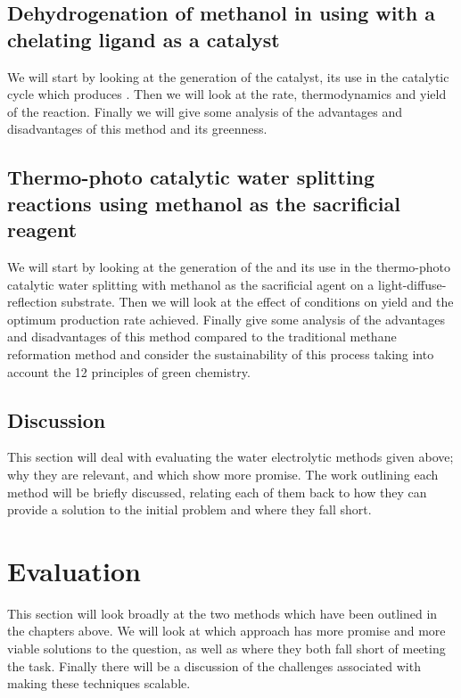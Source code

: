 \documentclass[a4paper]{article}
\begin{document}
\subsection{Dehydrogenation of methanol in  using  with a chelating ligand as a catalyst}%
\label{sub:Dehydrogenation_of_methanol_in_ce_MeOH_H2O_using_a_ce_Ru_catalyst}
We will start by looking at the generation of the catalyst, its use in the catalytic cycle which produces . 
Then we will look at the rate, thermodynamics and yield of the reaction. 
Finally we will give some analysis of the advantages and disadvantages of this method and its greenness.

\subsection{Thermo-photo catalytic water splitting reactions using methanol as the sacrificial reagent}%
\label{sub:Thermo_photo_catalytic_water_splitting_reactions_using_methanol_as_the_sacrificial_reagent}
We will start by looking at the generation of the  and its use in the thermo-photo catalytic water splitting with methanol as the sacrificial agent on a light-diffuse-reflection  substrate.
Then we will look at the effect of conditions on yield and the optimum production rate achieved.
Finally give some analysis of the advantages and disadvantages of this method compared to the traditional methane reformation method and consider the sustainability of this process taking into account the 12 principles of green chemistry.

\subsection{Discussion}%
\label{sub:discussion_water}
This section will deal with evaluating the water electrolytic methods given above; why they are relevant, and which show more promise.
The work outlining each method will be briefly discussed, relating each of them back to how they can provide a solution to the initial problem and where they fall short. 

\section{Evaluation}%
\label{sec:evaluation}
This section will look broadly at the two methods which have been outlined in the chapters above.
We will look at which approach has more promise and more viable solutions to the question, as well as where they both fall short of meeting the task. 
Finally there will be a discussion of the challenges associated with making these techniques scalable.
\end{document}
